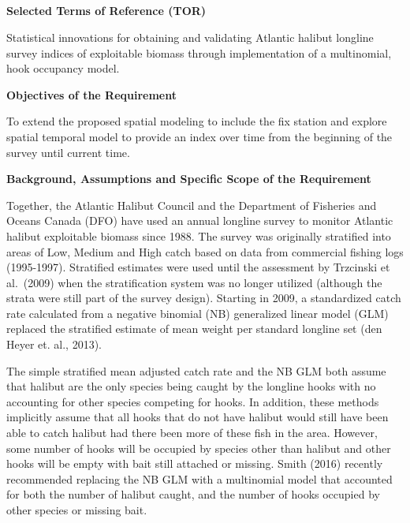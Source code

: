 \documentclass[12pt]{article}\usepackage[]{graphicx}\usepackage[]{color}
\begin{document}
\begin{appendices}

\clearpage

\section{}
\label{app:first-appendix}


\centering

\textbf{Selected Terms of Reference (TOR)} \flushleft

Statistical innovations for obtaining and validating Atlantic halibut longline survey indices of exploitable biomass through implementation of a multinomial, hook occupancy model.

\textbf{Objectives of the Requirement}

To extend the proposed spatial modeling to include the fix station and explore spatial temporal model to provide an index over time from the beginning of the survey until current time.

\textbf{Background, Assumptions and Specific Scope of the Requirement}

Together, the Atlantic Halibut Council and the Department of Fisheries and Oceans Canada (DFO) have used an annual longline survey to monitor Atlantic halibut exploitable biomass since 1988. The survey was originally stratified into areas of Low, Medium and High catch based on data from commercial fishing logs (1995-1997). Stratified estimates were used until the assessment by Trzcinski et al.~(2009) when the stratification system was no longer utilized (although the strata were still part of the survey design). Starting in 2009, a standardized catch rate calculated from a negative binomial (NB) generalized linear model (GLM) replaced the stratified estimate of mean weight per standard longline set (den Heyer et. al., 2013).

The simple stratified mean adjusted catch rate and the NB GLM both assume that halibut are the only species being caught by the longline hooks with no accounting for other species competing for hooks. In addition, these methods implicitly assume that all hooks that do not have halibut would still have been able to catch halibut had there been more of these fish in the area. However, some number of hooks will be occupied by species other than halibut and other hooks will be empty with bait still attached or missing. Smith (2016) recently recommended replacing the NB GLM with a multinomial model that accounted for both the number of halibut caught, and the number of hooks occupied by other species or missing bait.


\end{appendices}
\end{document}
